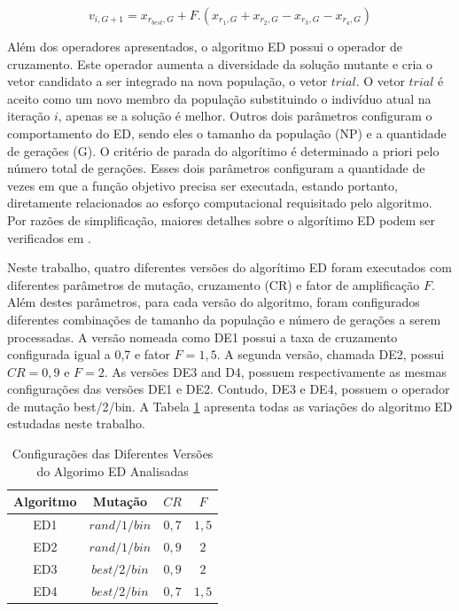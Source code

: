 \documentclass[12pt,A4,A4pt]{article}
\begin{document}
\begin{equation}
v_{i,G+1} = x_{r_{best},G} + F . (x_{r_{1},G} + x_{r_{2},G} - x_{r_{3},G} - x_{r_{4},G}) \label{trial2}
\end{equation}


Além dos operadores apresentados, o algoritmo ED possui o operador de cruzamento. Este operador aumenta a diversidade da solução mutante e cria o vetor candidato a ser integrado na nova população, o vetor $trial$. O vetor $trial$ é aceito como um novo membro da população substituindo o indivíduo atual na iteração $i$, apenas se a solução é melhor. Outros dois parâmetros configuram o comportamento do ED, sendo eles o tamanho da população (NP) e a quantidade de gerações (G). O critério de parada do algorítimo é determinado a priori pelo número total de gerações. Esses dois parâmetros configuram a quantidade de vezes em que a função objetivo precisa ser executada,  estando portanto, diretamente relacionados ao esforço computacional requisitado pelo algoritmo. Por razões de simplificação, maiores detalhes sobre o algorítimo ED podem ser verificados em \cite{Storn1997}.

Neste trabalho, quatro diferentes versões do algorítimo ED foram executados com diferentes parâmetros de mutação, cruzamento (CR) e fator de amplificação $F$. Além destes parâmetros, para cada versão do algoritmo, foram configurados diferentes combinações de tamanho da população e número de gerações  a serem processadas. A versão nomeada como DE1 possui a taxa de cruzamento  configurada igual a 0,7 e fator $F = 1,5$. A segunda versão, chamada DE2, possui $CR = 0,9$ e $F = 2$. As versões DE3 and D4, possuem respectivamente as mesmas configurações das versões DE1 e DE2. Contudo, DE3 e DE4, possuem o operador de mutação best/2/bin. A Tabela \ref{tab:algos} apresenta todas as variações do algoritmo ED estudadas neste trabalho.

\begin{table}[htbp]
\small
\centering
\caption{\small Configurações das Diferentes Versões do Algorimo ED Analisadas}
\begin{tabular}{cccc}
\hline
Algoritmo & Mutação & $CR$ & $F$ \\
\hline
ED1 & $rand/1/bin$ & $0,7$ & $1,5$  \\
ED2 & $rand/1/bin$ & $0,9$ & $2$  \\
ED3 & $best/2/bin$ & $0,9$ & $2$  \\
ED4 & $best/2/bin$ & $0,7$ & $1,5$  \\
\hline
\end{tabular}
  \label{tab:algos}
\end{table}
\end{document}
